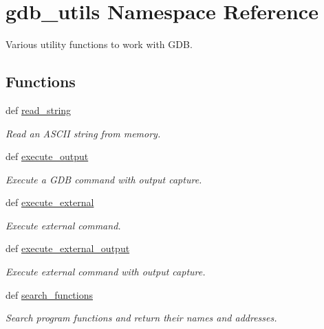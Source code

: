 \hypertarget{namespacegdb__utils}{
\section{gdb\_\-utils Namespace Reference}
\label{namespacegdb__utils}
}


Various utility functions to work with GDB.  


\subsection*{Functions}
\begin{DoxyCompactItemize}
\item 
def \hyperlink{namespacegdb__utils_a45c469a5d115a84fc5be337a498d53e8}{read\_\-string}
\begin{DoxyCompactList}\small\item\em Read an ASCII string from memory. \item\end{DoxyCompactList}\item 
def \hyperlink{namespacegdb__utils_ac02efa9be19432d56d87e0e8449a01b8}{execute\_\-output}
\begin{DoxyCompactList}\small\item\em Execute a GDB command with output capture. \item\end{DoxyCompactList}\item 
def \hyperlink{namespacegdb__utils_a66a2a66bb422efdc0bb1e70d0c2b7bdb}{execute\_\-external}
\begin{DoxyCompactList}\small\item\em Execute external command. \item\end{DoxyCompactList}\item 
def \hyperlink{namespacegdb__utils_a7d52a77166676bd83335c267ad476ceb}{execute\_\-external\_\-output}
\begin{DoxyCompactList}\small\item\em Execute external command with output capture. \item\end{DoxyCompactList}\item 
def \hyperlink{namespacegdb__utils_a5fe1761fbd0a4c2b9f707c2dfad64575}{search\_\-functions}
\begin{DoxyCompactList}\small\item\em Search program functions and return their names and addresses. \item\end{DoxyCompactList}\item 

\end{DoxyCompactItemize}
